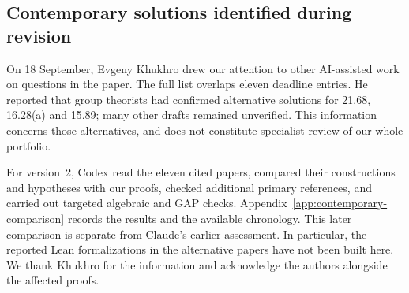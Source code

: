 \subsection{Contemporary solutions identified during revision}

On 18 September, Evgeny Khukhro drew our attention to other AI-assisted
work on questions in the paper. The full list overlaps eleven deadline
entries. He reported that group theorists had confirmed alternative
solutions for 21.68, 16.28(a) and 15.89; many other drafts remained
unverified. This information concerns those alternatives, and does not
constitute specialist review of our whole portfolio.

For version~2, Codex read the eleven cited papers, compared their
constructions and hypotheses with our proofs, checked additional primary
references, and carried out targeted algebraic and GAP checks.
Appendix~\ref{app:contemporary-comparison} records the results and the
available chronology. This later comparison is separate from Claude's
earlier assessment. In particular, the reported Lean formalizations in
the alternative papers have not been built here. We thank Khukhro for
the information and acknowledge the authors alongside the affected proofs.
